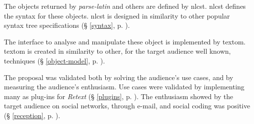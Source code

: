 The objects returned by \emph{parse-latin} and others are defined by
  \acrshort{nlcst}. \acrshort{nlcst} defines the syntax for these objects.
  \acrshort{nlcst} is designed in similarity to other popular syntax tree
  specifications (§ \ref{syntax}, p. \pageref{syntax}).

The interface to analyse and manipulate these object is implemented by
  \gls{textom}. \gls{textom} is created in similarity to other, for the target
  audience well known, techniques
  (§ \ref{object-model}, p. \pageref{object-model}).

The proposal was validated both by solving the audience's use cases, and
  by measuring the audience's enthusiasm.
Use cases were validated by implementing many as plug-ins for
  \emph{Retext} (§ \ref{plugins}, p. \pageref{plugins}).
The enthusiasm showed by the target audience on social networks, through
  e-mail, and social coding was positive
  (§ \ref{reception}, p. \pageref{reception}).

\endgroup
